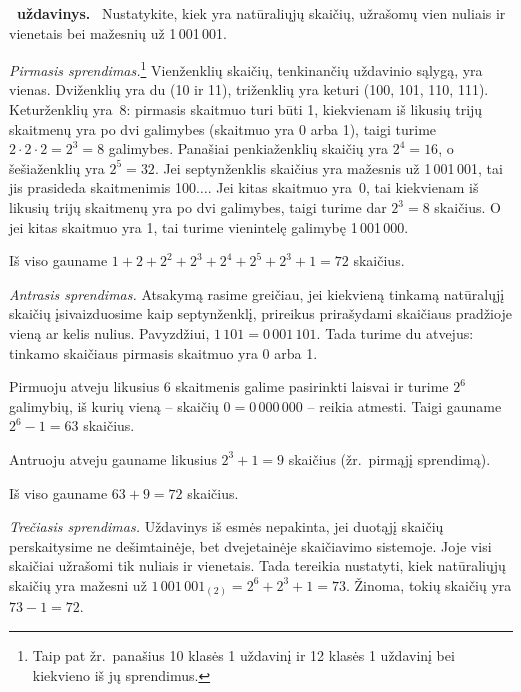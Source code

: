 \documentclass[11pt,a4paper]{article}
\newcounter{uzdavinys}
\newenvironment{uzdavinys}
  {\refstepcounter{uzdavinys}\par\medskip\noindent\textbf{\theuzdavinys\ uždavinys.}\ }
  {\par\medskip}
\begin{document}
\setcounter{uzdavinys}{0}

\begin{uzdavinys}
Nustatykite, kiek yra natūraliųjų skaičių, užrašomų vien nuliais ir vienetais bei mažesnių už 1\,001\,001.
\end{uzdavinys}
       
\textit{Pirmasis sprendimas.}\footnote{Taip pat žr.~panašius 10 klasės 1 uždavinį ir 12 klasės 1 uždavinį bei kiekvieno iš jų sprendimus.} Vienženklių skaičių, tenkinančių uždavinio sąlygą, yra vienas. Dviženklių yra du (10 ir 11), triženklių yra keturi (100, 101, 110, 111). Keturženklių yra~8: pirmasis skaitmuo turi būti 1, kiekvienam iš likusių trijų skaitmenų yra po dvi galimybes (skaitmuo yra 0 arba 1), taigi turime $2\cdot2\cdot2=2^3=8$ galimybes. Panašiai penkiaženklių skaičių yra $2^4=16$, o šešiaženklių yra $2^5=32$. Jei septynženklis skaičius yra mažesnis už 1\,001\,001, tai jis prasideda skaitmenimis 100$\ldots$. Jei kitas skaitmuo yra~0, tai kiekvienam iš likusių trijų skaitmenų yra po dvi galimybes, taigi turime dar $2^3=8$ skaičius. O jei kitas skaitmuo yra 1, tai turime vienintelę galimybę 1\,001\,000.

Iš viso gauname $1+2+2^2+2^3+2^4+2^5+2^3+1=72$ skaičius.

 \vspace{0,3cm}

\textit{Antrasis sprendimas.} Atsakymą rasime greičiau, jei kiekvieną tinkamą natūralųjį skaičių įsivaizduosime kaip septynženklį, prireikus prirašydami skaičiaus pradžioje vieną ar kelis nulius. Pavyzdžiui, $1\,101=0\,001\,101$. Tada turime du atvejus: tinkamo skaičiaus pirmasis skaitmuo yra 0 arba 1.

Pirmuoju atveju likusius 6 skaitmenis galime pasirinkti laisvai ir turime $2^6$ galimybių, iš kurių vieną -- skaičių $0=0\,000\,000$ -- reikia atmesti. Taigi gauname $2^6-1=63$ skaičius.

Antruoju atveju gauname likusius $2^3+1=9$ skaičius (žr.~pirmąjį sprendimą).

Iš viso gauname $63+9=72$ skaičius.

 \vspace{0,3cm}

\textit{Trečiasis sprendimas.} Uždavinys iš esmės nepakinta, jei duotąjį skaičių perskaitysime ne dešimtainėje, bet dvejetainėje skaičiavimo sistemoje.  Joje visi skaičiai užrašomi tik nuliais ir vienetais. Tada tereikia nustatyti, kiek natūraliųjų skaičių yra mažesni už $1\,001\,001_{(2)}=2^6+2^3+1=73$. Žinoma, tokių skaičių yra $73-1=72$.
\end{document}
